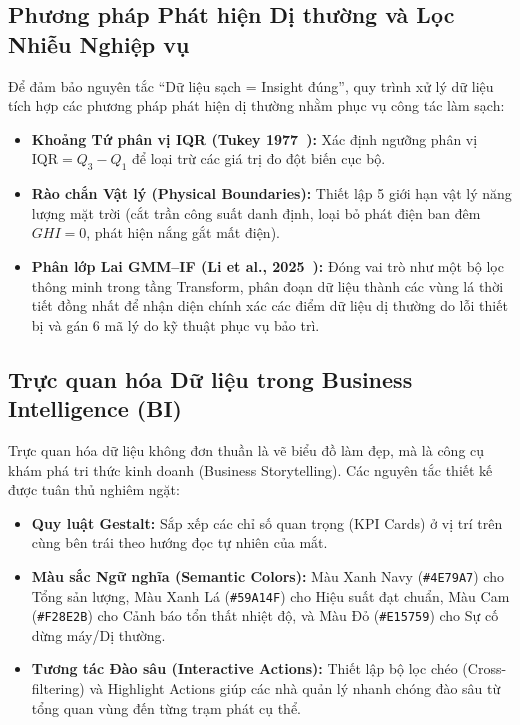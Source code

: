 \documentclass[12pt, a4paper]{report}
\begin{document}
\subsection{Phương pháp Phát hiện Dị thường và Lọc Nhiễu Nghiệp vụ}
Để đảm bảo nguyên tắc ``Dữ liệu sạch = Insight đúng'', quy trình xử lý dữ liệu tích hợp các phương pháp phát hiện dị thường nhằm phục vụ công tác làm sạch:
\begin{itemize}[noitemsep]
    \item \textbf{Khoảng Tứ phân vị IQR (Tukey 1977~\cite{tukey1977eda}):} Xác định ngưỡng phân vị $\text{IQR} = Q_3 - Q_1$ để loại trừ các giá trị đo đột biến cục bộ.
    \item \textbf{Rào chắn Vật lý (Physical Boundaries):} Thiết lập 5 giới hạn vật lý năng lượng mặt trời (cắt trần công suất danh định, loại bỏ phát điện ban đêm $GHI=0$, phát hiện nắng gắt mất điện).
    \item \textbf{Phân lớp Lai GMM--IF (Li et al., 2025~\cite{li2025gmmif}):} Đóng vai trò như một bộ lọc thông minh trong tầng Transform, phân đoạn dữ liệu thành các vùng lá thời tiết đồng nhất để nhận diện chính xác các điểm dữ liệu dị thường do lỗi thiết bị và gán 6 mã lý do kỹ thuật phục vụ bảo trì.
\end{itemize}

\subsection{Trực quan hóa Dữ liệu trong Business Intelligence (BI)}
Trực quan hóa dữ liệu không đơn thuần là vẽ biểu đồ làm đẹp, mà là công cụ khám phá tri thức kinh doanh (Business Storytelling). Các nguyên tắc thiết kế được tuân thủ nghiêm ngặt:
\begin{itemize}[noitemsep]
    \item \textbf{Quy luật Gestalt:} Sắp xếp các chỉ số quan trọng (KPI Cards) ở vị trí trên cùng bên trái theo hướng đọc tự nhiên của mắt.
    \item \textbf{Màu sắc Ngữ nghĩa (Semantic Colors):} Màu Xanh Navy (\texttt{\#4E79A7}) cho Tổng sản lượng, Màu Xanh Lá (\texttt{\#59A14F}) cho Hiệu suất đạt chuẩn, Màu Cam (\texttt{\#F28E2B}) cho Cảnh báo tổn thất nhiệt độ, và Màu Đỏ (\texttt{\#E15759}) cho Sự cố dừng máy/Dị thường.
    \item \textbf{Tương tác Đào sâu (Interactive Actions):} Thiết lập bộ lọc chéo (Cross-filtering) và Highlight Actions giúp các nhà quản lý nhanh chóng đào sâu từ tổng quan vùng đến từng trạm phát cụ thể.
\end{itemize}
\end{document}
